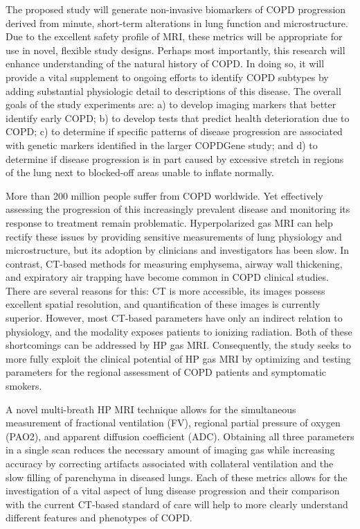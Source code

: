 \documentclass[11pt,]{article}
\begin{document}
The proposed study will generate non-invasive biomarkers of COPD
progression derived from minute, short-term alterations in lung function
and microstructure. Due to the excellent safety profile of MRI, these
metrics will be appropriate for use in novel, flexible study designs.
Perhaps most importantly, this research will enhance understanding of
the natural history of COPD. In doing so, it will provide a vital
supplement to ongoing efforts to identify COPD subtypes by adding
substantial physiologic detail to descriptions of this disease. The
overall goals of the study experiments are: a) to develop imaging
markers that better identify early COPD; b) to develop tests that
predict health deterioration due to COPD; c) to determine if specific
patterns of disease progression are associated with genetic markers
identified in the larger COPDGene study; and d) to determine if disease
progression is in part caused by excessive stretch in regions of the
lung next to blocked-off areas unable to inflate normally.

More than 200 million people suffer from COPD worldwide. Yet effectively
assessing the progression of this increasingly prevalent disease and
monitoring its response to treatment remain problematic. Hyperpolarized
gas MRI can help rectify these issues by providing sensitive
measurements of lung physiology and microstructure, but its adoption by
clinicians and investigators has been slow. In contrast, CT-based
methods for measuring emphysema, airway wall thickening, and expiratory
air trapping have become common in COPD clinical studies. There are
several reasons for this: CT is more accessible, its images possess
excellent spatial resolution, and quantification of these images is
currently superior. However, most CT-based parameters have only an
indirect relation to physiology, and the modality exposes patients to
ionizing radiation. Both of these shortcomings can be addressed by HP
gas MRI. Consequently, the study seeks to more fully exploit the
clinical potential of HP gas MRI by optimizing and testing parameters
for the regional assessment of COPD patients and symptomatic smokers.

A novel multi-breath HP MRI technique allows for the simultaneous
measurement of fractional ventilation (FV), regional partial pressure of
oxygen (PAO2), and apparent diffusion coefficient (ADC). Obtaining all
three parameters in a single scan reduces the necessary amount of
imaging gas while increasing accuracy by correcting artifacts associated
with collateral ventilation and the slow filling of parenchyma in
diseased lungs. Each of these metrics allows for the investigation of a
vital aspect of lung disease progression and their comparison with the
current CT-based standard of care will help to more clearly understand
different features and phenotypes of COPD.
\end{document}

